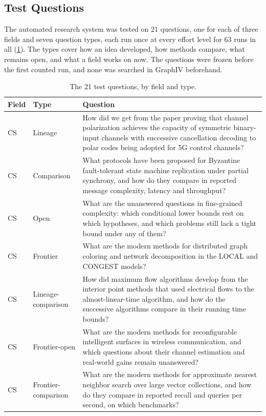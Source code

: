 \subsection{Test Questions}
\label{app:questions}

The automated research system was tested on 21 questions, one for each of three fields and seven question types, each run once at every effort level for 63 runs in all (\cref{tab:questions}). The types cover how an idea developed, how methods compare, what remains open, and what a field works on now. The questions were frozen before the first counted run, and none was searched in GraphIV beforehand.

\begin{table}[H]
\caption{The 21 test questions, by field and type.}
\label{tab:questions}
\centering
\small
\begin{tabular}{llp{}}
\toprule
Field & Type & Question \\
\midrule
CS & Lineage & How did we get from the paper proving that channel polarization achieves the capacity of symmetric binary-input channels with successive cancellation decoding to polar codes being adopted for 5G control channels? \\
CS & Comparison & What protocols have been proposed for Byzantine fault-tolerant state machine replication under partial synchrony, and how do they compare in reported message complexity, latency and throughput? \\
CS & Open & What are the unanswered questions in fine-grained complexity: which conditional lower bounds rest on which hypotheses, and which problems still lack a tight bound under any of them? \\
CS & Frontier & What are the modern methods for distributed graph coloring and network decomposition in the LOCAL and CONGEST models? \\
CS & Lineage-comparison & How did maximum flow algorithms develop from the interior point methods that used electrical flows to the almost-linear-time algorithm, and how do the successive algorithms compare in their running time bounds? \\
CS & Frontier-open & What are the modern methods for reconfigurable intelligent surfaces in wireless communication, and which questions about their channel estimation and real-world gains remain unanswered? \\
CS & Frontier-comparison & What are the modern methods for approximate nearest neighbor search over large vector collections, and how do they compare in reported recall and queries per second, on which benchmarks? \\

\end{tabular}
\end{table}
